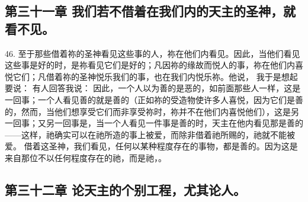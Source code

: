 
\subsection{第三十一章 我们若不借着在我们内的天主的圣神，就看不见。}

46. 至于那些借着祢的圣神看见这些事的人，祢在他们内看见。因此，当他们看见这些事是好的时，是祢看见它们是好的；凡因祢的缘故而悦人的事，祢在他们内喜悦它们；凡借着祢的圣神悦乐我们的事，也在我们内悦乐祢。他说， 我于是想起要说： 有人回答我说： 因此，一个人以为善的是恶的，如前面那些人一样，这是一回事；一个人看见善的就是善的（正如祢的受造物使许多人喜悦，因为它们是善的，然而，当他们想享受它们而非享受祢时，祢并不在他们内喜悦他们），这是另一回事；又另一回事是，当一个人看见一件事是善的时，天主在他内看见那是善的——这样，祂确实可以在祂所造的事上被爱，而除非借着祂所赐的，祂就不能被爱。 借着这圣神，我们看见，任何以某种程度存在的事物，都是善的。因为这是来自那位不以任何程度存在的祂，而是祂，。\par


\subsection{第三十二章 论天主的个别工程，尤其论人。}

